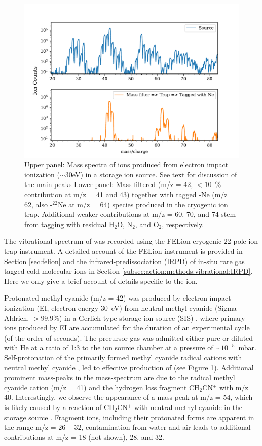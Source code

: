 \begin{figure}
	\centering
		\includegraphics[scale=.6]{chapters/CH3CNH+/figures/masspec_log.pdf}
	\caption{Upper panel: Mass spectra of ions produced from electron impact ionization ($\sim$30eV) in a storage ion source. See text for discussion of the main peaks Lower panel: { Mass filtered \pa (m/z = 42, $<10$~\% contribution at m/z = 41 and 43) together with tagged \pan -Ne (m/z = 62, also \pan -$^{22}$Ne at  m/z = 64) species produced in the cryogenic ion trap. Additional weaker contributions at m/z = 60, 70, and 74 stem from tagging with residual H$_2$O, N$_2$, and O$_2$, respectively.}  }
	\label{FIG:CH3CNH+:masspec}
\end{figure}

The vibrational spectrum of \pa was recorded using the FELion cryogenic 22-pole ion trap instrument.  A detailed account of the FELion instrument is provided in Section \ref{sec:felion} and the infrared-predissociation (IRPD) of in-situ rare gas tagged cold molecular ions in Section \ref{subsec:action:methods:vibrational:IRPD}. Here we only give a brief account of details specific to the \pa ion.

Protonated methyl cyanide (m/z = 42) was produced by electron impact ionization (EI, electron energy 30~eV) from neutral methyl cyanide (Sigma Aldrich, $>99.9$\%) in a Gerlich-type storage ion source (SIS) \cite{Gerlich1992}, where primary ions produced by EI are accumulated for the duration of an experimental cycle (of the order of seconds). { The precursor gas was admitted either pure or diluted with He at a ratio of 1:3 to the ion source chamber at a pressure of $\sim 10^{-5}$~mbar. Self-protonation of the primarily formed methyl cyanide radical cations with neutral methyl cyanide \cite{TFI2010}, led to effective production of \pa (see Figure \ref{FIG:CH3CNH+:masspec}). Additional prominent mass-peaks in the mass-spectrum are due to the radical methyl cyanide cation (m/z = 41) and the hydrogen loss fragment CH$_2$CN$^+$ with m/z = 40. Interestingly, we observe the appearance of a mass-peak at m/z = 54, which is likely caused by a reaction of CH$_2$CN$^+$ with neutral methyl cyanide in the storage source \cite{ATF2012}. Fragment ions, including their protonated  forms are apparent in the range m/z = $26 - 32$, contamination from water and air leads to additional contributions at m/z = 18 (not shown), 28, and 32.} 

